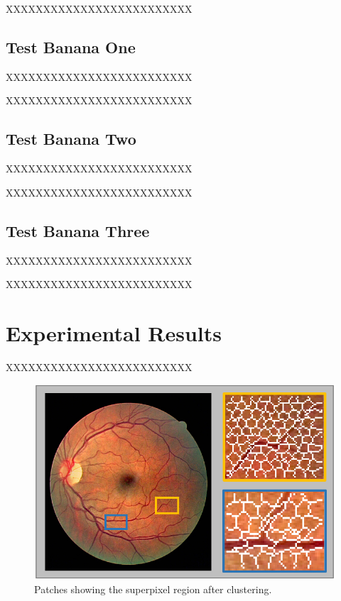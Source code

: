 \documentclass[journal]{IEEEtran}
\begin{document}
XXXXXXXXXXXXXXXXXXXXXXXXX

\subsection{Test Banana One}
XXXXXXXXXXXXXXXXXXXXXXXXX

XXXXXXXXXXXXXXXXXXXXXXXXX

\subsection{Test Banana Two}
XXXXXXXXXXXXXXXXXXXXXXXXX

XXXXXXXXXXXXXXXXXXXXXXXXX

\subsection{Test Banana Three}
XXXXXXXXXXXXXXXXXXXXXXXXX

XXXXXXXXXXXXXXXXXXXXXXXXX

\section{Experimental Results}
XXXXXXXXXXXXXXXXXXXXXXXXX

\begin{figure}
\footnotesize\centering
\centerline{\includegraphics[width=0.8\linewidth]{Fig5.jpg}}\caption{Patches showing the superpixel region after clustering.}
\label{fig5}
\end{figure}
\end{document}
